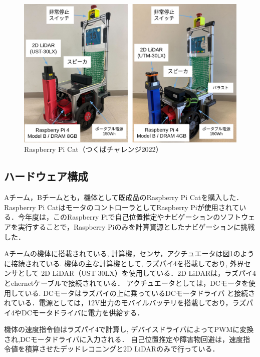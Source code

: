 \documentclass[twocolumn,9pt]{jsproceedings}
\begin{document}
\begin{figure}[h]
	\begin{center}
		\includegraphics[width=1.0\linewidth]{figs/raspicat.pdf}
		\caption{Raspberry Pi Cat（つくばチャレンジ2022）}
		\label{fig:raspicat}
	\end{center}
\end{figure}

\subsection{ハードウェア構成}


Aチーム，Bチームとも，機体として既成品のRaspberry Pi Catを購入した．Raspberry Pi CatはモータのコントローラとしてRaspberry Piが使用されている．今年度は，このRaspberry Piで自己位置推定やナビゲーションのソフトウェアを実行することで，Raspberry Piのみを計算資源としたナビゲーションに挑戦した．

Aチームの機体に搭載されている, 計算機，センサ，アクチュエータは図\ref{fig:raspicat}のように接続されている.
機体の主な計算機として, ラズパイ4を搭載しており, 外界センサとして
2D LiDAR（UST 30LX）を使用している．2D LiDARは，ラズパイ4とehernetケーブルで接続されている．
アクチュエータとしては，DCモータを使用している. DCモータはラズパイの上に乗っているDCモータドライバ
と接続されている．電源としては，12V出力のモバイルバッテリを搭載しており，ラズパイ4やDCモータドライバに電力を供給する．

機体の速度指令値はラズパイ4で計算し, デバイスドライバによってPWMに変換され,DCモータドライバに入力される．
自己位置推定や障害物回避は，速度指令値を積算させたデッドレコニングと2D LiDARのみで行っている．
\end{document}

